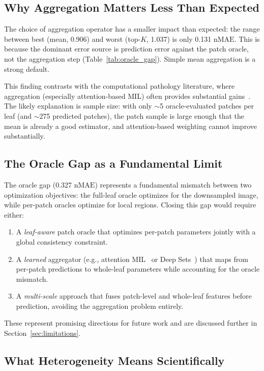 \documentclass[11pt,a4paper]{article}
\newcommand{\nMAE}{\mathrm{nMAE}}
\begin{document}
\subsection{Why Aggregation Matters Less Than Expected}

The choice of aggregation operator has a smaller impact than expected: the range between best (mean, 0.906) and worst (top-$K$, 1.037) is only 0.131 $\nMAE$.
This is because the dominant error source is prediction error against the patch oracle, not the aggregation step (Table~\ref{tab:oracle_gap}).
Simple mean aggregation is a strong default.

This finding contrasts with the computational pathology literature, where aggregation (especially attention-based MIL) often provides substantial gains~\citep{ilse2018attention, lu2021mil}.
The likely explanation is sample size: with only $\sim$5 oracle-evaluated patches per leaf (and $\sim$275 predicted patches), the patch sample is large enough that the mean is already a good estimator, and attention-based weighting cannot improve substantially.

\subsection{The Oracle Gap as a Fundamental Limit}

The oracle gap (0.327 $\nMAE$) represents a fundamental mismatch between two optimization objectives: the full-leaf oracle optimizes for the downsampled image, while per-patch oracles optimize for local regions.
Closing this gap would require either:
\begin{enumerate}[nosep]
    \item A \emph{leaf-aware} patch oracle that optimizes per-patch parameters jointly with a global consistency constraint.
    \item A \emph{learned} aggregator (e.g., attention MIL~\citep{ilse2018attention} or Deep Sets~\citep{zaheer2017deepsets}) that maps from per-patch predictions to whole-leaf parameters while accounting for the oracle mismatch.
    \item A \emph{multi-scale} approach that fuses patch-level and whole-leaf features before prediction, avoiding the aggregation problem entirely.
\end{enumerate}
These represent promising directions for future work and are discussed further in Section~\ref{sec:limitations}.

\subsection{What Heterogeneity Means Scientifically}
\end{document}
